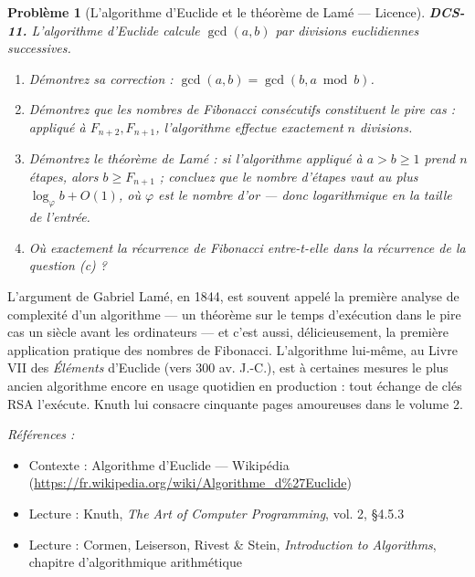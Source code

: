 \documentclass[11pt]{article}
\newtheorem{problem}{Problème}
\newenvironment{refs}{\par\small\noindent\emph{Références :}\begin{itemize}\setlength\itemsep{0pt}}{\end{itemize}\normalsize}
\begin{document}
\begin{problem}[{L'algorithme d'Euclide et le théorème de Lamé --- Licence}]
\textbf{DCS-11.} L'algorithme d'Euclide calcule $\gcd(a, b)$ par divisions euclidiennes successives.
\begin{enumerate}
\item[(a)] Démontrez sa correction : $\gcd(a, b) = \gcd(b, a \bmod b)$.
\item[(b)] Démontrez que les nombres de Fibonacci consécutifs constituent le pire cas : appliqué à $F_{n+2}, F_{n+1}$, l'algorithme effectue exactement $n$ divisions.
\item[(c)] Démontrez le théorème de Lamé : si l'algorithme appliqué à $a > b \ge 1$ prend $n$ étapes, alors $b \ge F_{n+1}$ ; concluez que le nombre d'étapes vaut au plus $\log_{\varphi} b + O(1)$, où $\varphi$ est le nombre d'or --- donc logarithmique en la taille de l'entrée.
\item[(d)] Où exactement la récurrence de Fibonacci entre-t-elle dans la récurrence de la question (c) ?
\end{enumerate}

\end{problem}

\noindent L'argument de Gabriel Lamé, en 1844, est souvent appelé la première analyse de complexité d'un algorithme --- un théorème sur le temps d'exécution dans le pire cas un siècle avant les ordinateurs --- et c'est aussi, délicieusement, la première application pratique des nombres de Fibonacci. L'algorithme lui-même, au Livre VII des \textit{Éléments} d'Euclide (vers 300 av. J.-C.), est à certaines mesures le plus ancien algorithme encore en usage quotidien en production : tout échange de clés RSA l'exécute. Knuth lui consacre cinquante pages amoureuses dans le volume 2.

\begin{refs}
\item Contexte : Algorithme d'Euclide --- Wikipédia (\url{https://fr.wikipedia.org/wiki/Algorithme_d%27Euclide})
\item Lecture : Knuth, \textit{The Art of Computer Programming}, vol. 2, \S{}4.5.3
\item Lecture : Cormen, Leiserson, Rivest \& Stein, \textit{Introduction to Algorithms}, chapitre d'algorithmique arithmétique
\end{refs}

\bigskip
\end{document}
